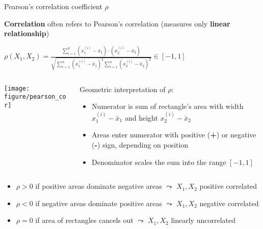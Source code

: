 \documentclass[11pt,compress,t,notes=noshow, aspectratio=169, xcolor=table]{beamer}
\begin{document}
\begin{frame}{Pearson's correlation coefficient $\rho$}

\textbf{Correlation} often refers to Pearson's correlation (measures only \textbf{linear relationship}) %
\smallskip



\centerline{$\rho(X_1, X_2) = \tfrac{\sum_{i=1}^{n}{(x_1^{(i)}-\bar{x}_1) \cdot (x_2^{(i)}-\bar{x}_2)}}{\sqrt{\sum_{i=1}^{n}{(x_1^{(i)}-\bar{x}_1)^2 \sum_{i=1}^{n}{(x_2^{(i)}-\bar{x}_2)^2 }}}} \in [-1, 1]$}

\bigskip

\begin{columns}[T, totalwidth=\textwidth]
\begin{column}{0.6\linewidth}
\texttt{[image: figure/pearson\_cor]}
\end{column}
\begin{column}{0.4\linewidth}

Geometric interpretation of $\rho$:
\begin{itemize}
    \item Numerator is sum of rectangle's area with width $x_1^{(i)}-\bar{x}_1$ and height $x_2^{(i)}-\bar{x}_2$
    \item Areas enter numerator with positive (\textbf{+}) or negative (\textbf{-}) sign, depending on position
    \item Denominator scales the sum into the range $[-1, 1]$
\end{itemize}
\end{column}
\end{columns}

\medskip
\pause
\begin{itemize}
    \item $\rho > 0$ if {\color{ggblue}positive areas} dominate {\color{ggred}negative areas} 
    $\leadsto$ $X_1, X_2$ positive correlated
    \item $\rho < 0$ if {\color{ggred}negative areas} dominate {\color{ggblue}positive areas} 
    $\leadsto$ $X_1, X_2$ negative correlated
    \item $\rho = 0$ if area of rectangles cancels out
    $\leadsto$ $X_1, X_2$ linearly uncorrelated
\end{itemize}

\end{frame}
\end{document}
